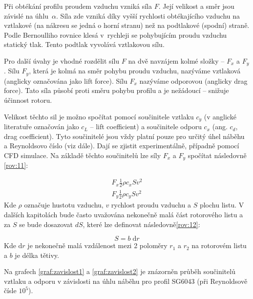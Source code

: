 	Při obtékání profilu proudem vzduchu vzniká síla $F$. Její velikost a směr jsou závislé na úhlu~$\alpha$. Síla zde vzniká díky vyšší rychlosti obtékajícího vzduchu na vztlakové (na nákresu se jedná o horní stranu) než na podtlakové (spodní) straně. Podle Bernoulliho rovnice klesá v~rychleji se pohybujícím proudu vzduchu statický tlak. Tento podtlak vyvolává vztlakovou sílu\cite{Rychetnik:Motory}.
	
	Pro další úvahy je vhodné rozdělit sílu $F$ na dvě navzájem kolmé složky – $F_x$ a $F_y$. Sílu $F_y$, která je kolmá na směr pohybu proudu vzduchu, nazýváme vztlaková (anglicky označována jako lift force). Sílu $F_x$ nazýváme odporovou (anglicky drag force). Tato síla působí proti směru pohybu profilu a je nežádoucí – snižuje účinnost rotoru\cite{Rychetnik:Motory}\cite{ve:ve}.
	
	Velikost těchto sil je možno spočítat pomocí součinitele vztlaku $c_y$ (v anglické literatuře označován jako $c_L$ – lift coefficient) a součinitele odporu $c_x$ (ang. $c_d$, drag coefficient). Tyto součinitelé jsou vždy platní pouze pro určitý úhel náběhu a Reynoldsovo číslo (viz dále). Dají se zjistit experimentálně, případně pomocí CFD simulace. Na základě těchto součinitelů lze síly $F_x$ a $F_y$ spočítat následovně \eqref{rov:11}\cite{Rychetnik:Motory}:
	
	\begin{eqnarray}
			\label{rov:11}
			F_x \frac{1}{2}\rho c_x Sv^2 \nonumber \\
			F_y \frac{1}{2}\rho c_y Sv^2
	\end{eqnarray}
	Kde $\rho$ označuje hustotu vzduchu, $v$ rychlost proudu vzduchu a $S$ plochu listu. V dalších kapitolách bude často uvažována nekonečně malá část rotorového listu a za $S$ se bude dosazovat $dS$, které lze definovat následovně\eqref{rov:12}\cite{Rychetnik:Motory}: 
	
		\begin{equation}
				\label{rov:12}
				S=b\;\mathrm{d}r
		\end{equation}
	Kde $\mathrm{d}r$ je nekonečně malá vzdálenost mezi 2 poloměry $r_1$ a $r_2$ na rotorovém listu a $b$ je délka tětivy.
	
	Na grafech \ref{graf:zavislost1} a \ref{graf:zavislost2} je znázorněn průběh součinitelů vztlaku a odporu v závislosti na úhlu náběhu pro profil SG6043 (při Reynoldsově čísle $10^5$).
	

